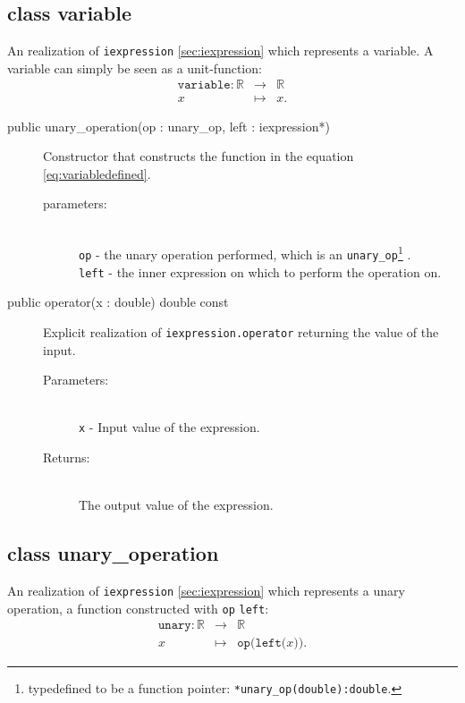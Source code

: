 \documentclass[a4paper,11pt]{kth-mag}
\newcommand{\RR}{\ensuremath{\mathbb{R}}}
\begin{document}
\subsection{class variable} An realization of \texttt{iexpression}
\ref{sec:iexpression} which represents a variable. A variable can simply be
seen as a unit-function:
\begin{eqnarray}
    \label{eq:variabledefined}
    \texttt{variable}: \RR &\rightarrow& \RR \nonumber \\
    x &\mapsto& x .
\end{eqnarray}
\begin{description}
    \item[public unary\_operation(op : unary\_op, left : iexpression*)] Constructor 
    that constructs the function in the equation \ref{eq:variabledefined}. 
    \begin{description}
        \item[parameters:]~\\
            \verb+op+ - the unary operation performed, which is an \texttt{unary\_op}\footnote{typedefined to
            be a function pointer: \texttt{*unary\_op(double):double}.} .\\
            \verb+left+ - the inner expression on which to perform the
            operation on.
    \end{description}
\end{description}
\begin{description}
    \item[public operator(x : double) double const] 
    Explicit realization of \texttt{iexpression.operator} returning the value
    of the input.
    \begin{description}
        \item[Parameters:]~\\
            \verb+x+ - Input value of the expression.
        \item[Returns:]~\\
            The output value of the expression.
    \end{description}
\end{description}


\subsection{class unary\_operation} An realization of \texttt{iexpression}
\ref{sec:iexpression} which represents a unary operation, a function
constructed with \texttt{op} \texttt{left}:
\begin{eqnarray}
    \label{eq:unarydefined}
    \texttt{unary}:\RR &\rightarrow& \RR \nonumber \\
    x &\mapsto& \texttt{op(left(}x\texttt{))}. 
\end{eqnarray}
\end{document}
